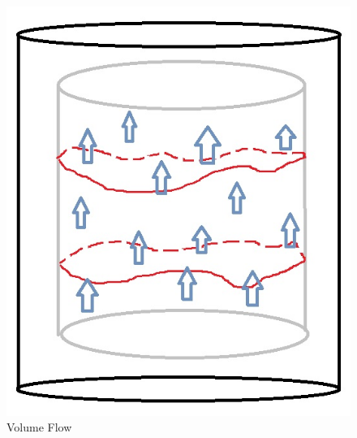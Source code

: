 \documentclass[8pt,aspectratio=169]{beamer}
\begin{document}
\begin{frame}
\begin{minipage}[t]{0.44\linewidth}
\begin{figure}
\begin{center}
        \includegraphics[scale=0.6]{Nesting}    
    
    \end{center}
    \caption{Volume Flow}
    \label{fig:WDW}
\end{figure}

\end{minipage}

\end{frame}
\end{document}
